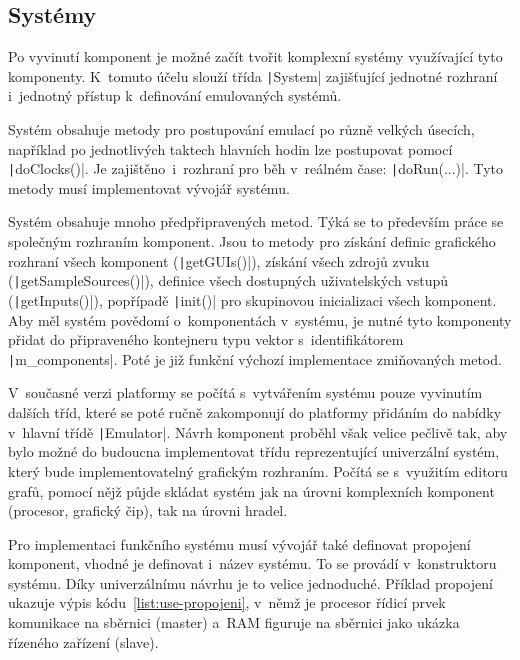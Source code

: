 \subsection{Systémy}
Po vyvinutí komponent je možné začít tvořit komplexní systémy využívající tyto komponenty. K~tomuto účelu slouží třída \texttt|System| zajišťující jednotné rozhraní i~jednotný přístup k~definování emulovaných systémů.

Systém obsahuje metody pro postupování emulací po různě velkých úsecích, například po jednotlivých taktech hlavních hodin lze postupovat pomocí \texttt|doClocks()|. Je zajištěno~i~rozhraní pro běh v~reálném čase: \texttt|doRun(...)|. Tyto metody musí implementovat vývojář systému.

Systém obsahuje mnoho předpřipravených metod. Týká se to především práce se společným rozhraním komponent. Jsou to metody pro získání definic grafického rozhraní všech komponent (\texttt|getGUIs()|), získání všech zdrojů zvuku (\texttt|getSampleSources()|), definice všech dostupných uživatelských vstupů (\texttt|getInputs()|), popřípadě \texttt|init()| pro skupinovou inicializaci všech komponent. Aby měl systém povědomí o~komponentách v~systému, je nutné tyto komponenty přidat do připraveného kontejneru typu vektor s~identifikátorem \texttt|m_components|. Poté je již funkční výchozí implementace zmiňovaných metod.

\begin{note}
	V~současné verzi platformy se počítá s~vytvářením systému pouze vyvinutím dalších tříd, které se poté ručně zakomponují do platformy přidáním do nabídky v~hlavní třídě \texttt|Emulator|. Návrh komponent proběhl však velice pečlivě tak, aby bylo možné do budoucna implementovat třídu reprezentující univerzální systém, který bude implementovatelný grafickým rozhraním. Počítá se s~využitím editoru grafů, pomocí nějž půjde skládat systém jak na úrovni komplexních komponent (procesor, grafický čip), tak na úrovni hradel.
\end{note}

Pro implementaci funkčního systému musí vývojář také definovat propojení komponent, vhodné je definovat i~název systému. To se provádí v~konstruktoru systému. Díky univerzálnímu návrhu je to velice jednoduché. Příklad propojení ukazuje výpis kódu~\ref{list:use-propojeni}, v~němž je procesor řídicí prvek komunikace na sběrnici (master) a~RAM figuruje na sběrnici jako ukázka řízeného zařízení (slave).

